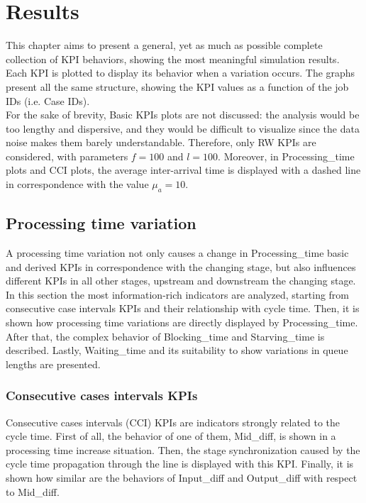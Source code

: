 \chapter{Results}
\label{chapter 6}
\ifpdf
    \graphicspath{{Chapter6/Figs/}{Chapter6/Figs/PDF/}{Chapter6/Figs/}}
\else
    \graphicspath{{Chapter6/Figs/Vector/}{Chapter6/Figs/}}
\fi
This chapter aims to present a general, yet as much as possible complete collection of KPI behaviors, showing the most meaningful simulation results. Each KPI is plotted to display its behavior when a variation occurs. The graphs present all the same structure, showing the KPI values as a function of the job IDs (i.e. Case IDs). \\
For the sake of brevity, Basic KPIs plots are not discussed: the analysis would be too lengthy and dispersive, and they would be difficult to visualize since the data noise makes them barely understandable. Therefore, only RW KPIs are considered, with parameters $f = 100$ and $l = 100$. Moreover, in Processing\_time plots and CCI plots, the average inter-arrival time is displayed with a dashed line in correspondence with the value $\mu_a=10$.
\section{Processing time variation}
A processing time variation not only causes a change in Processing\_time basic and derived KPIs in correspondence with the changing stage, but also influences different KPIs in all other stages, upstream and downstream the changing stage. \\
In this section the most information-rich indicators are analyzed, starting from consecutive case intervals KPIs and their relationship with cycle time. Then, it is shown how processing time variations are directly displayed by Processing\_time. After that, the complex behavior of Blocking\_time and Starving\_time is described. Lastly, Waiting\_time and its suitability to show variations in queue lengths are presented.
\newpage
\subsection{Consecutive cases intervals KPIs}
\label{Consecutive cases intervals KPIs - Processing time variation}
Consecutive cases intervals (CCI) KPIs are indicators strongly related to the cycle time. First of all, the behavior of one of them, Mid\_diff, is shown in a processing time increase situation. Then, the stage synchronization caused by the cycle time propagation through the line is displayed with this KPI. Finally, it is shown how similar are the behaviors of Input\_diff and Output\_diff with respect to Mid\_diff.
